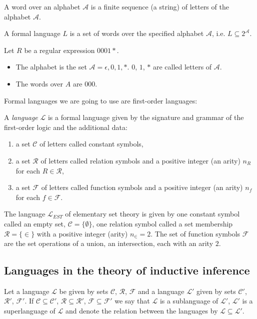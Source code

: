 \begin{defn}
A word over an alphabet $\mathcal{A}$ is a finite sequence (a string) of letters of the alphabet $\mathcal{A}$.
\end{defn}

\begin{defn}
A formal language $L$ is a set of words over the specified alphabet $\mathcal{A}$, i.e. $L \subseteq 2^\mathcal{A}$.
\end{defn}

\begin{exmp}
Let $R$ be a regular expression $0001*$.
\begin{itemize}
\item The alphabet is the set $\mathcal{A}={\epsilon, 0,1,*}$. $0$, $1$, $*$ are called letters of $\mathcal{A}$.
\item The words over $A$ are $000$.
\end{itemize}
\end{exmp}

Formal languages we are going to use are first-order languages:
\begin{defn}
A \emph{language} $\mathcal{L}$ is a formal language given by the signature and grammar of the first-order logic and the additional data:
\begin{enumerate}
\item a set $\mathcal{C}$ of letters called constant symbols,
\item a set $\mathcal{R}$ of letters called relation symbols and a positive integer (an arity) $n_R$ for each $R \in \mathcal{R}$,
\item a set $\mathcal{F}$ of letters called function symbols and a positive integer (an arity) $n_f$ for each $f \in \mathcal{F}$.
\end{enumerate}
\end{defn}

\begin{exmp}
The language $\mathcal{L}_{EST}$ of elementary set theory is given by one constant symbol called an empty set, $\mathcal{C}=\{\emptyset\}$, one relation symbol called a set membership $\mathcal{R}=\{\in\}$ with a positive integer (arity) $n_{\in}=2$. The set of function symbols $\mathcal{F}$ are the set operations of a union, an intersection, each with an arity $2$.
\end{exmp}

\subsection{Languages in the theory of inductive inference}
\begin{defn}
Let a language $\mathcal{L}$ be given by sets $\mathcal{C}$, $\mathcal{R}$, $\mathcal{F}$ and a language $\mathcal{L}'$ given by sets $\mathcal{C}'$, $\mathcal{R}'$, $\mathcal{F}'$.
If $\mathcal{C} \subseteq \mathcal{C}'$, $\mathcal{R} \subseteq \mathcal{R}'$, $\mathcal{F} \subseteq \mathcal{F}'$ we say that $\mathcal{L}$ is a sublanguage of $\mathcal{L}'$, $\mathcal{L}'$ is a superlanguage of $\mathcal{L}$ and denote the relation between the languages by $\mathcal{L} \subseteq \mathcal{L}'$.
\end{defn}

